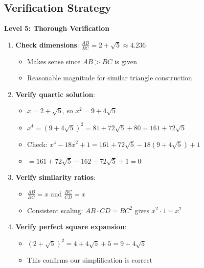 \documentclass[]{article}
\begin{document}
\begin{verificationbox}
\subsection*{Verification Strategy}

\textbf{Level 5: Thorough Verification}

\begin{enumerate}
    \item \textbf{Check dimensions}: $\frac{AB}{BC} = 2 + \sqrt{5} \approx 4.236$
    \begin{itemize}
        \item Makes sense since $AB > BC$ is given
        \item Reasonable magnitude for similar triangle construction
    \end{itemize}
    
    \item \textbf{Verify quartic solution}:
    \begin{itemize}
        \item $x = 2 + \sqrt{5}$, so $x^2 = 9 + 4\sqrt{5}$
        \item $x^4 = (9 + 4\sqrt{5})^2 = 81 + 72\sqrt{5} + 80 = 161 + 72\sqrt{5}$
        \item Check: $x^4 - 18x^2 + 1 = 161 + 72\sqrt{5} - 18(9 + 4\sqrt{5}) + 1$
        \item $= 161 + 72\sqrt{5} - 162 - 72\sqrt{5} + 1 = 0$ \checkmark
    \end{itemize}
    
    \item \textbf{Verify similarity ratios}:
    \begin{itemize}
        \item $\frac{AB}{BC} = x$ and $\frac{BC}{CD} = x$ \checkmark
        \item Consistent scaling: $AB \cdot CD = BC^2$ gives $x^2 \cdot 1 = x^2$ \checkmark
    \end{itemize}
    
    \item \textbf{Verify perfect square expansion}:
    \begin{itemize}
        \item $(2 + \sqrt{5})^2 = 4 + 4\sqrt{5} + 5 = 9 + 4\sqrt{5}$ \checkmark
        \item This confirms our simplification is correct
    \end{itemize}
    

\end{enumerate}
\end{verificationbox}
\end{document}
